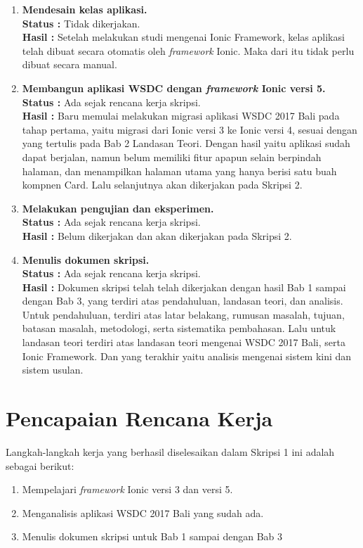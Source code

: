 \documentclass[a4paper,twoside]{article}
\begin{document}
\begin{enumerate}
		\item \textbf{Mendesain kelas aplikasi.}\\
		{\bf Status :} Tidak dikerjakan.\\
		{\bf Hasil :} Setelah melakukan studi mengenai Ionic Framework, kelas aplikasi telah dibuat secara otomatis oleh \textit{framework} Ionic. Maka dari itu tidak perlu dibuat secara manual.
		
		\item \textbf{Membangun aplikasi WSDC dengan \textit{framework} Ionic versi 5.}\\
		{\bf Status :} Ada sejak rencana kerja skripsi.\\
		{\bf Hasil :} Baru memulai melakukan migrasi aplikasi WSDC 2017 Bali pada tahap pertama, yaitu migrasi dari Ionic versi 3 ke Ionic versi 4, sesuai dengan yang tertulis pada Bab 2 Landasan Teori. Dengan hasil yaitu aplikasi sudah dapat berjalan, namun belum memiliki fitur apapun selain berpindah halaman, dan menampilkan halaman utama yang hanya berisi satu buah kompnen Card. Lalu selanjutnya akan dikerjakan pada Skripsi 2.
		
		\item \textbf{Melakukan pengujian dan eksperimen.}\\
		{\bf Status :} Ada sejak rencana kerja skripsi.\\
		{\bf Hasil :} Belum dikerjakan dan akan dikerjakan pada Skripsi 2.
		
		\item \textbf{Menulis dokumen skripsi.}\\
		{\bf Status :} Ada sejak rencana kerja skripsi.\\
		{\bf Hasil :} Dokumen skripsi telah telah dikerjakan dengan hasil Bab 1 sampai dengan Bab 3, yang terdiri atas pendahuluan, landasan teori, dan analisis. Untuk pendahuluan, terdiri atas latar belakang, rumusan masalah, tujuan, batasan masalah, metodologi, serta sistematika pembahasan. Lalu untuk landasan teori terdiri atas landasan teori mengenai WSDC 2017 Bali, serta Ionic Framework. Dan yang terakhir yaitu analisis mengenai sistem kini dan sistem usulan.

	\end{enumerate}

\section{Pencapaian Rencana Kerja}
Langkah-langkah kerja yang berhasil diselesaikan dalam Skripsi 1 ini adalah sebagai berikut:
\begin{enumerate}
\item Mempelajari \textit{framework} Ionic versi 3 dan versi 5.
\item Menganalisis aplikasi WSDC 2017 Bali yang sudah ada.
\item Menulis dokumen skripsi untuk Bab 1 sampai dengan Bab 3
\end{enumerate}
\end{document}
